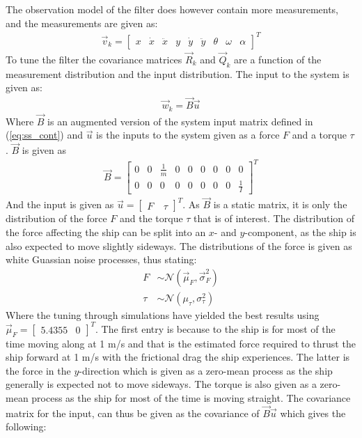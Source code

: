 \documentclass[journal]{IEEEtran}
\begin{document}
The observation model of the filter does however contain more measurements, and the measurements are given as:
\begin{align}
\vec{v}_k = \begin{bmatrix}
x & \dot{x} & \ddot{x} & y & \dot{y} & \ddot{y} & \theta & \omega & \alpha
\end{bmatrix}^T
\end{align}
To tune the filter the covariance matrices $\vec{R}_k$ and $\vec{Q}_k$ are a function of the measurement distribution and the input distribution. The input to the system is given as:
\begin{align}
\vec{w}_k = \vec{B}\vec{u}
\end{align}
Where $\vec{B}$ is an augmented version of the system input matrix defined in (\ref{eq:ss_cont}) and $\vec{u}$ is the inputs to the system given as a force $F$ and a torque $\tau$. $\vec{B}$ is given as 
\begin{align}
\vec{B} = \begin{bmatrix}
0 & 0 & \frac{1}{m} & 0 & 0 & 0 & 0 & 0 & 0\\
0 & 0 & 0 & 0 & 0 & 0 & 0 & 0 & \frac{1}{I} \end{bmatrix}^T
\end{align} 
And the input is given as $\vec{u} = \begin{bmatrix}F\ & \tau\end{bmatrix}^T$. As $\vec{B}$ is a static matrix, it is only the distribution of the force $F$ and the torque $\tau$ that is of interest. The distribution of the force affecting the ship can be split into an $x$- and $y$-component, as the ship is also expected to move slightly sideways. The distributions of the force is given as white Guassian noise processes, thus stating:
\begin{align}
F&\sim \mathcal{N}(\vec{\mu}_F,\vec{\sigma}^2_F)\\
\tau&\sim \mathcal{N}(\mu_\tau,\sigma^2_\tau)
\end{align}
Where the tuning through simulations have yielded the best results using $\vec{\mu}_F = \begin{bmatrix}5.4355 & 0\end{bmatrix}^T$. The first entry is because to the ship is for most of the time moving along at 1 m/s and that is the estimated force required to thrust the ship forward at 1 m/s with the frictional drag the ship experiences. The latter is the force in the $y$-direction which is given as a zero-mean process as the ship generally is expected not to move sideways. The torque is also given as a zero-mean process as the ship for most of the time is moving straight. The covariance matrix for the input, can thus be given as the covariance of $\vec{B}\vec{u}$ which gives the following:
\end{document}
